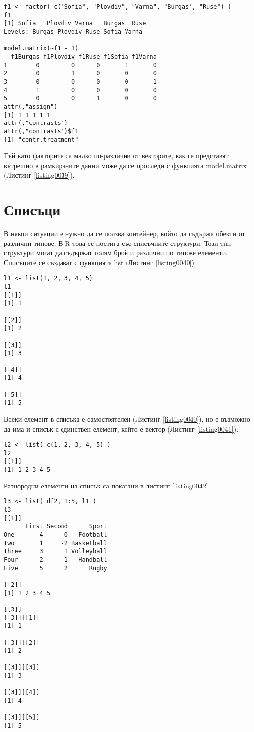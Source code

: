 \begin{lstlisting}[caption=Вътрешно представяне на факторите, label=listing0039]
f1 <- factor( c("Sofia", "Plovdiv", "Varna", "Burgas", "Ruse") )
f1
[1] Sofia   Plovdiv Varna   Burgas  Ruse   
Levels: Burgas Plovdiv Ruse Sofia Varna

model.matrix(~f1 - 1)
  f1Burgas f1Plovdiv f1Ruse f1Sofia f1Varna
1        0         0      0       1       0
2        0         1      0       0       0
3        0         0      0       0       1
4        1         0      0       0       0
5        0         0      1       0       0
attr(,"assign")
[1] 1 1 1 1 1
attr(,"contrasts")
attr(,"contrasts")$f1
[1] "contr.treatment"
\end{lstlisting}

Тъй като факторите са малко по-различни от векторите, как се представят вътрешно в рамкираните данни може да се проследи с функцията model.matrix (Листинг \ref{listing0039}).

\section{Списъци}

В някои ситуации е нужно да се ползва контейнер, който да съдържа обекти от различни типове. В R това се постига със списъчните структури. Този тип структури могат да съдържат голям брой и различни по типове елементи. Списъците се създават с функцията list (Листинг \ref{listing0040}).

\begin{lstlisting}[caption=Създаване на списък, label=listing0040]
l1 <- list(1, 2, 3, 4, 5)
l1
[[1]]
[1] 1

[[2]]
[1] 2

[[3]]
[1] 3

[[4]]
[1] 4

[[5]]
[1] 5
\end{lstlisting}

Всеки елемент в списъка е самостоятелен (Листинг \ref{listing0040}), но е възможно да има и списък с единствен елемент, който е вектор (Листинг \ref{listing0041}).

\begin{lstlisting}[caption=Вектор в списък, label=listing0041]
l2 <- list( c(1, 2, 3, 4, 5) )
l2
[[1]]
[1] 1 2 3 4 5
\end{lstlisting}

Разнородни елементи на списък са показани в листинг \ref{listing0042}.

\begin{lstlisting}[caption=Списък с разнородни данни, label=listing0042]
l3 <- list( df2, 1:5, l1 )
l3
[[1]]
      First Second      Sport
One       4      0   Football
Two       1     -2 Basketball
Three     3      1 Volleyball
Four      2     -1   Handball
Five      5      2      Rugby

[[2]]
[1] 1 2 3 4 5

[[3]]
[[3]][[1]]
[1] 1

[[3]][[2]]
[1] 2

[[3]][[3]]
[1] 3

[[3]][[4]]
[1] 4

[[3]][[5]]
[1] 5
\end{lstlisting}

